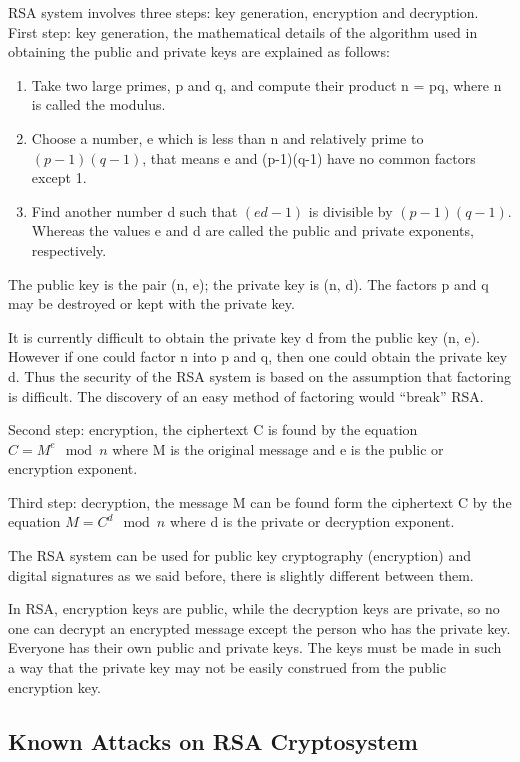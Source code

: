 \documentclass[12pt,journal,compsoc]{IEEEtran}
\begin{document}
RSA system involves three steps: key generation, encryption and
decryption. First step: key generation, the mathematical details of
the algorithm used in obtaining the public and private keys are
explained as follows:
\begin{enumerate}
\item Take two large primes, p and q, and compute their product n =
  pq, where n is called the modulus. 
\item Choose a number, e which is less than n and relatively prime to
  $(p-1)(q-1)$, that means e and (p-1)(q-1) have no common  factors
  except 1. 
\item Find another number d such that $(ed - 1)$ is divisible by
  $(p-1)(q-1)$. Whereas the values e and d are called the public and
  private exponents, respectively. 
\end{enumerate}
\par
The public key is the pair (n, e); the private key is (n, d). The
factors p and q may be destroyed or kept with the private key. 
\par
It is currently difficult to obtain the private key d from the public
key (n, e). However if one could factor n into p and q, then one could
obtain the private key d. Thus the security of the RSA system is based
on the assumption that factoring is difficult. The discovery of an
easy method of factoring would ``break'' RSA. 
\par
Second step: encryption, the ciphertext C is found by the equation $C
= M^{e}\mod n$ where M is the original message and e is the public or
encryption exponent. 
\par
Third step: decryption, the message M can be found form the ciphertext
C by the equation $M = C^{d}\mod n$ where d is the private or decryption
exponent. 
\par
The RSA system can be used for public key cryptography (encryption)
and digital signatures as we said before, there is slightly different
between them. 
\par
In RSA, encryption keys are public, while the decryption keys are
private, so no one can decrypt an encrypted message except the person
who has the private key. Everyone has their own public and private
keys. The keys must be made in such a way that the private key may not
be easily construed from the public encryption key. 

\subsection{Known Attacks on RSA Cryptosystem}
\label{sec:known-attacks-rsa}
\end{document}
